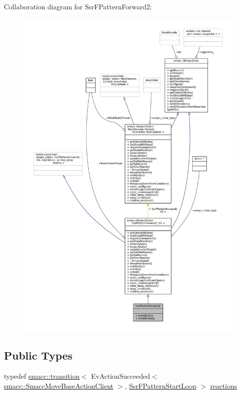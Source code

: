 Collaboration diagram for Ssr\+F\+Pattern\+Forward2\+:
\nopagebreak
\begin{figure}[H]
\begin{center}
\leavevmode
\includegraphics[width=350pt]{structSsrFPatternForward2__coll__graph}
\end{center}
\end{figure}
\subsection*{Public Types}
\begin{DoxyCompactItemize}
\item 
typedef \hyperlink{classsmacc_1_1transition}{smacc\+::transition}$<$ Ev\+Action\+Succeeded$<$ \hyperlink{classsmacc_1_1SmaccMoveBaseActionClient}{smacc\+::\+Smacc\+Move\+Base\+Action\+Client} $>$, \hyperlink{structSsrFPatternStartLoop}{Ssr\+F\+Pattern\+Start\+Loop} $>$ \hyperlink{structSsrFPatternForward2_a99e7488097a68de736567e9f7da6d77f}{reactions}
\end{DoxyCompactItemize}
